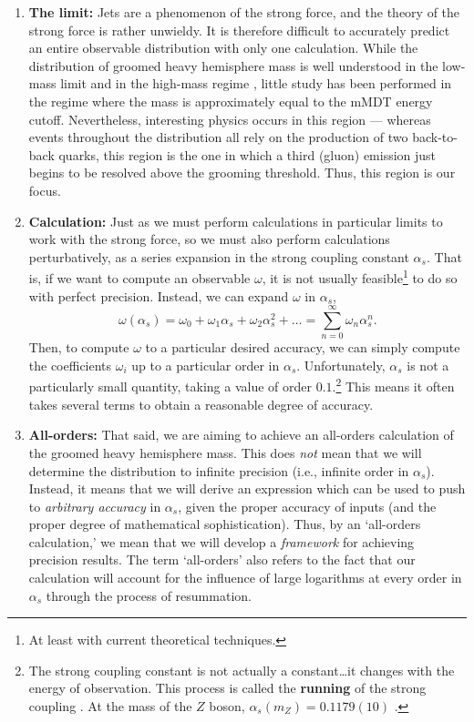 \documentclass[../thesis.tex]{subfiles}
\begin{document}
\begin{enumerate}
		\item \textbf{The limit:} Jets are a phenomenon of the strong force, and the theory of the strong force is rather unwieldy. It is therefore difficult to accurately predict an entire observable distribution with only one calculation. While the distribution of groomed heavy hemisphere mass is well understood in the low-mass limit \cite{kardos_groomed_2020,kardos_two-_2020,frye_factorization_2016} and in the high-mass regime \cite{kardos_soft-drop_2018}, little study has been performed in the regime where the mass is approximately equal to the mMDT energy cutoff. Nevertheless, interesting physics occurs in this region --- whereas events throughout the distribution all rely on the production of two back-to-back quarks, this region is the one in which a third (gluon) emission just begins to be resolved above the grooming threshold. Thus, this region is our focus.

		\item \textbf{Calculation:} Just as we must perform calculations in particular limits to work with the strong force, so we must also perform calculations perturbatively, as a series expansion in the strong coupling constant $\alpha_s$. That is, if we want to compute an observable $\omega$, it is not usually feasible\footnote{At least with current theoretical techniques.} to do so with perfect precision. Instead, we can expand $\omega$ in $\alpha_s$,
		\begin{equation}
			\omega(\alpha_s) = \omega_0 + \omega_1 \alpha_s + \omega_2 \alpha_s^2 + \dots = \sum_{n = 0}^\infty \omega_n \alpha_s^n.
		\end{equation}
		Then, to compute $\omega$ to a particular desired accuracy, we can simply compute the coefficients $\omega_i$ up to a particular order in $\alpha_s$. Unfortunately, $\alpha_s$ is not a particularly small quantity, taking a value of order $0.1$.\footnote{The strong coupling constant is not actually a constant\dots it changes with the energy of observation. This process is called the \textbf{running} of the strong coupling \cite{larkoski_elementary_2019-1}. At the mass of the $Z$ boson, $\alpha_s(m_Z) = 0.1179(10)$ \cite{particle_data_group_review_2020}.} This means it often takes several terms to obtain a reasonable degree of accuracy.

		\item \textbf{All-orders:} That said, we are aiming to achieve an all-orders calculation of the groomed heavy hemisphere mass. This does \textit{not} mean that we will determine the distribution to infinite precision (i.e., infinite order in $\alpha_s$). Instead, it means that we will derive an expression which can be used to push to \textit{arbitrary accuracy} in $\alpha_s$, given the proper accuracy of inputs (and the proper degree of mathematical sophistication). Thus, by an `all-orders calculation,' we mean that we will develop a \textit{framework} for achieving precision results. The term `all-orders' also refers to the fact that our calculation will account for the influence of large logarithms at every order in $\alpha_s$ through the process of resummation.
	\end{enumerate}
\end{document}
